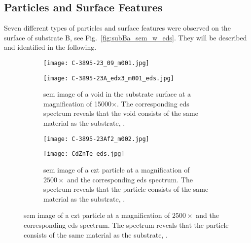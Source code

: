 \subsection{Particles and Surface Features}
Seven different types of particles and surface features were observed on the surface of substrate B, see Fig.~\ref{fig:subBa_sem_w_eds}. They will be described and identified in the following.
\begin{figure}[htbp]
    \centering
    \begin{subfigure}[t]{\textwidth}
          \begin{minipage}[t]{0.48\linewidth}
            \centering
            \texttt{[image: C-3895-23\_09\_m001.jpg]}%
          \end{minipage}
          \hfill
          \begin{minipage}[t]{0.48\linewidth}
            \centering
            \texttt{[image: C-3895-23A\_edx3\_m001\_eds.jpg]}
          \end{minipage}
        \caption{\ac{sem} image of a void in the substrate surface at a magnification of 15000$\times$. The corresponding \ac{eds} spectrum reveals that the void consists of the same material as the substrate, .}\label{fig:SEM_C389523_void_eds}
    \end{subfigure}%
    \par\bigskip
    \begin{subfigure}[t]{\textwidth}
          \begin{minipage}[t]{0.48\linewidth}
            \centering
            \texttt{[image: C-3895-23Af2\_m002.jpg]}
          \end{minipage}
          \hfill
          \begin{minipage}[t]{0.49\linewidth}
            \centering
            \texttt{[image: CdZnTe\_eds.jpg]}
          \end{minipage}
        \caption{\Ac{sem} image of a \ac{czt} particle at a magnification of $2500\times$ and the corresponding \ac{eds} spectrum. The spectrum reveals that the particle consists of the same material as the substrate, .}\label{fig:SEM_B_particulates_eds}

\end{subfigure}
\end{figure}
